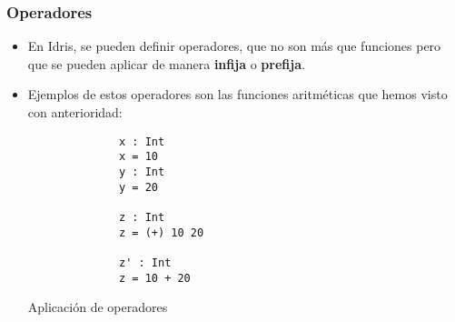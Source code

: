 \documentclass{beamer}
\begin{document}
\begin{frame}[fragile]
  \frametitle{Operadores}

  \begin{itemize}
    \item En Idris, se pueden definir operadores, que no son más que funciones pero que
      se pueden aplicar de manera \textbf{infija} o \textbf{prefija}.
    \item Ejemplos de estos operadores son las funciones aritméticas que hemos visto con
      anterioridad:
      \begin{listing}[H]
        \begin{center}
          \begin{minipage}{0.5\textwidth}
              \begin{verbatim}
              x : Int
              x = 10
              y : Int
              y = 20

              z : Int
              z = (+) 10 20

              z' : Int
              z = 10 + 20
              \end{verbatim}
          \end{minipage}
        \end{center}
        \caption{Aplicación de operadores}
        \label{lst:apopidris1}
      \end{listing}
  \end{itemize}
\end{frame}
\end{document}
